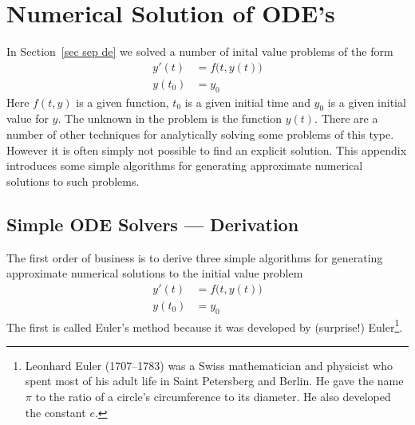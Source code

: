 %
%
\graphicspath{{figures/odeNumerical/}}

\chapter{Numerical Solution of ODE's}\label{app ODE numerical}
In Section~\ref{sec sep de} we solved a number of inital value problems of the 
form
\begin{align*}
y'(t)&=f\big(t,y(t)\big) \\
y(t_0)&=y_0
\end{align*}
Here $f(t,y)$ is a given function, $t_0$ is a given initial time and
$y_0$ is a given initial value for $y$. The unknown in the problem is the
function $y(t)$. There are a number of other techniques for analytically 
solving some problems of this type. However it is often simply not 
possible to find an explicit solution. This appendix introduces some 
simple algorithms for generating approximate numerical solutions to 
such problems. 

\section{Simple ODE Solvers --- Derivation}
The first order of business is to derive three simple algorithms for
generating approximate numerical solutions to the initial value problem
\begin{align*}
y'(t)&=f\big(t,y(t)\big) \\
y(t_0)&=y_0
\end{align*}
The first is called Euler's method because it was developed by (surprise!) 
Euler\footnote{Leonhard Euler (1707--1783) was a  Swiss mathematician and physicist who spent most of his adult life in Saint Petersberg and Berlin. He gave the name $\pi$ to the ratio of a circle's circumference to its diameter. He also developed the constant $e$.}.
